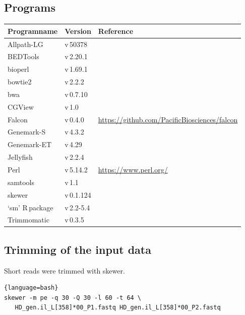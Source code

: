 \documentclass[12pt,a4paper]{scrartcl}
\begin{document}
\subsection*{Programs}

\begin{tabularx}{\linewidth}{llX}\toprule
Programname & Version & Reference \\ \midrule
Allpath-LG  & v\,50378 & \textcite{Gnerre2011, Ribeiro2012} \\
BEDTools    & v\,2.20.1 & \textcite{Quinlan2010} \\
bioperl     & v\,1.69.1 & \textcite{Stajich2002} \\
bowtie2     & v\,2.2.2 & \textcite{Langmead2012} \\
bwa         & v\,0.7.10 & \textcite{Li2009a,Li2010} \\
CGView      & v\,1.0 & \textcite{Grin2011} \\
Falcon      & v\,0.4.0 & \url{https://github.com/PacificBiosciences/falcon} \\
Genemark-S  & v\,4.3.2 & \textcite{Besemer2001} \\
Genemark-ET & v\,4.29 & \textcite{Lomsadze2014} \\
Jellyfish   & v\,2.2.4  & \textcite{Marcais2011} \\
Perl        & v\,5.14.2  & \url{https://www.perl.org/} \\
samtools    & v\,1.1 & \textcite{Li2009b, Li2011a, Li2011b} \\
skewer      & v\,0.1.124 & \textcite{Jiang2014} \\
`sm' R\,package & v\,2.2-5.4 & \textcite{Bowman2014} \\
Trimmomatic & v\,0.3.5 & \textcite{Bolger2014} \\
\end{tabularx}

\subsection*{Trimming of the input data}

Short reads were trimmed with skewer.

\begin{lstlisting}{language=bash}
skewer -m pe -q 30 -Q 30 -l 60 -t 64 \
   HD_gen.il_L[358]*00_P1.fastq HD_gen.il_L[358]*00_P2.fastq
\end{lstlisting}
\end{document}
